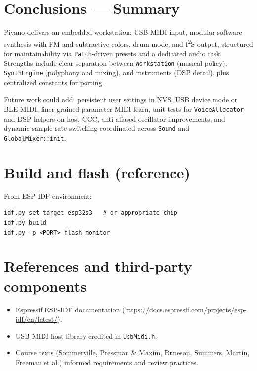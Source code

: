 \documentclass[11pt,a4paper]{article}
\begin{document}
\section{Conclusions --- Summary}

Piyano delivers an embedded workstation: USB MIDI input, modular software synthesis with FM and subtractive colors, drum mode, and I\textsuperscript{2}S output, structured for maintainability via \texttt{Patch}-driven presets and a dedicated audio task. Strengths include clear separation between \texttt{Workstation} (musical policy), \texttt{SynthEngine} (polyphony and mixing), and instruments (DSP detail), plus centralized constants for porting.

Future work could add: persistent user settings in NVS, USB device mode or BLE MIDI, finer-grained parameter MIDI learn, unit tests for \texttt{VoiceAllocator} and DSP helpers on host GCC, anti-aliased oscillator improvements, and dynamic sample-rate switching coordinated across \texttt{Sound} and \texttt{GlobalMixer::init}.

\appendix
\section{Build and flash (reference)}
From ESP-IDF environment:
\begin{lstlisting}
idf.py set-target esp32s3   # or appropriate chip
idf.py build
idf.py -p <PORT> flash monitor
\end{lstlisting}

\section{References and third-party components}
\begin{itemize}[noitemsep]
  \item Espressif ESP-IDF documentation (\url{https://docs.espressif.com/projects/esp-idf/en/latest/}).
  \item USB MIDI host library credited in \texttt{UsbMidi.h}.
  \item Course texts (Sommerville, Pressman \& Maxim, Runeson, Summers, Martin, Freeman et al.) informed requirements and review practices.
\end{itemize}
\end{document}
